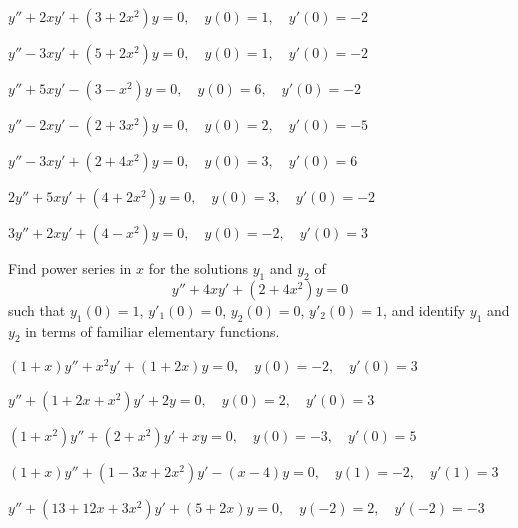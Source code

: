 \begin{exerciselist}
  \item\label{exer:7.3.32} \Cex $y''+2xy'+(3+2x^{2})y=0,\quad y(0)=1,\quad y'(0)=-2$

  \item\label{exer:7.3.33} \Cex $y''-3xy'+(5+2x^{2})y=0,\quad y(0)=1,\quad y'(0)=-2$

  \item\label{exer:7.3.34} \Cex $y''+5xy'-(3-x^{2})y=0,\quad y(0)=6,\quad y'(0)=-2$

  \item\label{exer:7.3.35} \Cex $y''-2xy'-(2+3x^{2})y=0,\quad y(0)=2,\quad y'(0)=-5$

  \item\label{exer:7.3.36} \Cex $y''-3xy'+(2+4x^{2})y=0,\quad y(0)=3,\quad y'(0)=6$

  \item\label{exer:7.3.37} \Cex $2y''+5xy'+(4+2x^{2})y=0,\quad y(0)=3,\quad y'(0)=-2$

  \item\label{exer:7.3.38} \Cex $3y''+2xy'+(4-x^{2})y=0,\quad y(0)=-2,\quad y'(0)=3$

  \item\label{exer:7.3.39} Find power series in $x$ for the solutions $y_{1}$ and $y_{2}$ of
  \[
    y''+4xy'+(2+4x^{2})y=0
  \]
  such that $y_{1}(0)=1$,\; $y'_{1}(0)=0$,\; $y_{2}(0)=0$,\; $y'_{2}(0)=1$, and identify $y_{1}$ and
  $y_{2}$ in terms of familiar elementary functions.


  \item\label{exer:7.3.40} \Cex $(1+x)y''+x^{2}y'+(1+2x)y=0,\quad y(0)=-2,\quad y'(0)=3$

  \item\label{exer:7.3.41} \Cex $y''+(1+2x+x^{2})y'+2y=0,\quad y(0)=2,\quad y'(0)=3$

  \item\label{exer:7.3.42} \Cex $(1+x^{2})y''+(2+x^{2})y'+xy=0,\quad y(0)=-3,\quad y'(0)=5$

  \item\label{exer:7.3.43} \Cex $(1+x)y''+(1-3x+2x^{2})y'-(x-4)y=0,\quad y(1)=-2,\quad y'(1)=3$

  \item\label{exer:7.3.44} \Cex $y''+(13+12x+3x^{2})y'+(5+2x)y=0,\quad y(-2)=2,\quad y'(-2)=-3$


\end{exerciselist}
